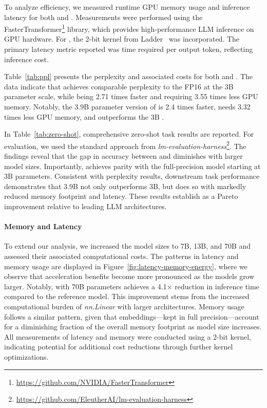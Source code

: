 To analyze efficiency, we measured runtime GPU memory usage and inference latency for both  and . Measurements were performed using the FasterTransformer\footnote{\url{https://github.com/NVIDIA/FasterTransformer}} library, which provides high-performance LLM inference on GPU hardware. For , the 2-bit kernel from Ladder~\cite{ladder} was incorporated. The primary latency metric reported was time required per output token, reflecting inference cost.

Table~\ref{tab:ppl} presents the perplexity and associated costs for both  and . The data indicate that  achieves comparable perplexity to the FP16  at the 3B parameter scale, while being 2.71 times faster and requiring 3.55 times less GPU memory. Notably, the 3.9B parameter version of  is 2.4 times faster, needs 3.32 times less GPU memory, and outperforms the 3B .

In Table~\ref{tab:zero-shot}, comprehensive zero-shot task results are reported. For evaluation, we used the standard approach from \emph{lm-evaluation-harness}\footnote{\url{https://github.com/EleutherAI/lm-evaluation-harness}}. The findings reveal that the gap in accuracy between  and  diminishes with larger model sizes. Importantly,  achieves parity with the full-precision model starting at 3B parameters. Consistent with perplexity results, downstream task performance demonstrates that  3.9B not only outperforms  3B, but does so with markedly reduced memory footprint and latency. These results establish  as a Pareto improvement relative to leading LLM architectures.

\paragraph{Memory and Latency}

To extend our analysis, we increased the model sizes to 7B, 13B, and 70B and assessed their associated computational costs. The patterns in latency and memory usage are displayed in Figure~\ref{fig:latency-memory-energy}, where we observe that acceleration benefits become more pronounced as the models grow larger. Notably,  with 70B parameters achieves a 4.1$\times$ reduction in inference time compared to the  reference model. This improvement stems from the increased computational burden of \emph{nn.Linear} with larger architectures. Memory usage follows a similar pattern, given that embeddings—kept in full precision—account for a diminishing fraction of the overall memory footprint as model size increases. All measurements of latency and memory were conducted using a 2-bit kernel, indicating potential for additional cost reductions through further kernel optimizations.

